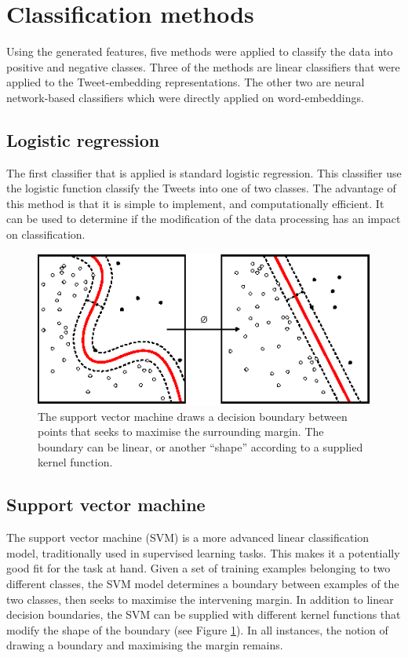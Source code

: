 \section{Classification methods}
\label{sec:methods}
Using the generated features, five methods were applied to classify the data into positive and negative classes. Three of the methods are linear classifiers that were applied to the Tweet-embedding representations. The other two are neural network-based classifiers which were directly applied on word-embeddings.

\subsection{Logistic regression}
The first classifier that is applied is standard logistic regression. This classifier use the logistic function classify the Tweets into one of two classes. The advantage of this method is that it is simple to implement, and computationally efficient. It can be used to determine if the modification of the data processing has an impact on classification.

\begin{figure}[h!]
\centering
	\includegraphics[scale=1.2]{SVM} 
\caption{The support vector machine draws a decision boundary between points that seeks to maximise the surrounding margin. The boundary can be linear, or another ``shape'' according to a supplied kernel function. \cite{wikiSVM}}
\label{plot:SVM}
\end{figure}
\FloatBarrier

\subsection{Support vector machine}
The support vector machine (SVM) is a more advanced linear classification model, traditionally used in supervised learning tasks. This makes it a potentially good fit for the task at hand. Given a set of training examples belonging to two different classes, the SVM model determines a boundary between examples of the two classes, then seeks to maximise the intervening margin. In addition to linear decision boundaries, the SVM can be supplied with different kernel functions that modify the shape of the boundary (see Figure \ref{plot:SVM}). In all instances, the notion of drawing a boundary and maximising the margin remains.

